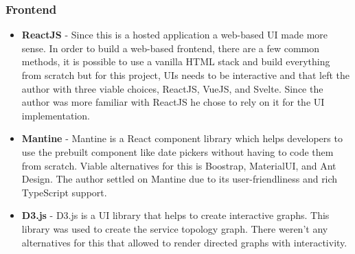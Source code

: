 \subsubsection{Frontend}
\begin{itemize}
    \item \textbf{ReactJS} - Since this is a hosted application a web-based UI made more sense. In order to build a web-based frontend, there are a few common methods, it is possible to use a vanilla HTML stack and build everything from scratch but for this project, UIs needs to be interactive and that left the author with three viable choices, ReactJS, VueJS, and Svelte. Since the author was more familiar with ReactJS he chose to rely on it for the UI implementation.
    \item \textbf{Mantine} - Mantine is a React component library which helps developers to use the prebuilt component like date pickers without having to code them from scratch. Viable alternatives for this is Boostrap, MaterialUI, and Ant Design. The author settled on Mantine due to its user-friendliness and rich TypeScript support.
    \item \textbf{D3.js} - D3.js is a UI library that helps to create interactive graphs. This library was used to create the service topology graph. There weren't any alternatives for this that allowed to render directed graphs with interactivity.
\end{itemize}



